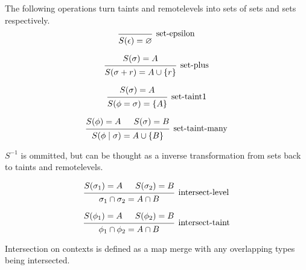 \documentclass{article}
\begin{document}
The following operations turn taints and remotelevels into
sets of sets and sets respectively.
\[
\begin{prooftree}
    \infer0[set-epsilon]{S(\epsilon) = \varnothing}
\end{prooftree}
\]

\[
\begin{prooftree}
    \hypo{S(\sigma) = A} 
    \infer1[set-plus]{S(\sigma + r) = A \cup \{r\}}
\end{prooftree}
\]

\[
\begin{prooftree}
    \hypo{S(\sigma) = A} 
    \infer1[set-taint1]{S(\phi = \sigma) = \{A\}}
\end{prooftree}
\]

\[
\begin{prooftree}
    \hypo{S(\phi) = A}
    \hypo{S(\sigma) = B}
    \infer2[set-taint-many]{S(\phi \mid \sigma) = A \cup \{B\}}
\end{prooftree}
\]

$S^{-1}$ is ommitted, but can be thought as a inverse transformation from sets 
back to taints and remotelevels.


\[
\begin{prooftree}
    \hypo{S(\sigma_1) = A}
    \hypo{S(\sigma_2) = B}
    \infer2[intersect-level]{\sigma_1 \cap \sigma_2 = A \cap B}
\end{prooftree}
\]


\[
\begin{prooftree}
    \hypo{S(\phi_1) = A}
    \hypo{S(\phi_2) = B}
    \infer2[intersect-taint]{\phi_1 \cap \phi_2 = A \cap B}
\end{prooftree}
\]

Intersection on contexts is defined as a map merge with any overlapping types being
intersected.
\end{document}
